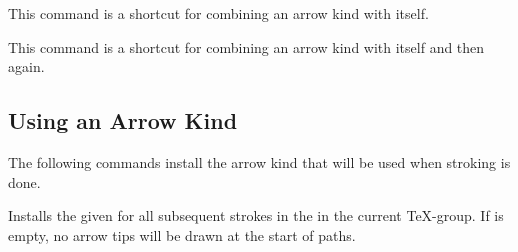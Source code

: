 \begin{command}{\pgfarrowsdeclaredouble{}}
  This command is a shortcut for combining an arrow kind with itself.

\begin{codeexample}[]
%
\begin{pgfpicture}
  \pgfsetarrows{<<->>}
  \pgfsetlinewidth{1ex}
  \pgfpathmoveto{\pgfpointorigin}
  \pgfpathlineto{\pgfpoint{4cm}{2cm}}
\end{pgfpicture}
\end{codeexample} 
\end{command}


\begin{command}{\pgfarrowsdeclaretriple{}}
  This command is a shortcut for combining an arrow kind with itself
  and then again.

\begin{codeexample}[]
%
\begin{pgfpicture}
  \pgfsetarrows{<<<->>>}
  \pgfsetlinewidth{1ex}
  \pgfpathmoveto{\pgfpointorigin}
  \pgfpathlineto{\pgfpoint{4cm}{2cm}}
\end{pgfpicture}
\end{codeexample} 
\end{command}





\subsection{Using an Arrow Kind}

The following commands install the arrow kind that will be used when
stroking is done.

\begin{command}{\pgfsetarrowsstart{}}
  Installs the given  for all subsequent
  strokes in the in the current \TeX-group. If 
  is empty, no arrow tips will be drawn at the start of paths.
\begin{codeexample}[]
\begin{pgfpicture}
  \pgfsetlinewidth{1ex}
  \pgfpathmoveto{\pgfpointorigin}
  \pgfpathlineto{\pgfpoint{4cm}{2cm}}
\end{pgfpicture}
\end{codeexample} 
\end{command}

